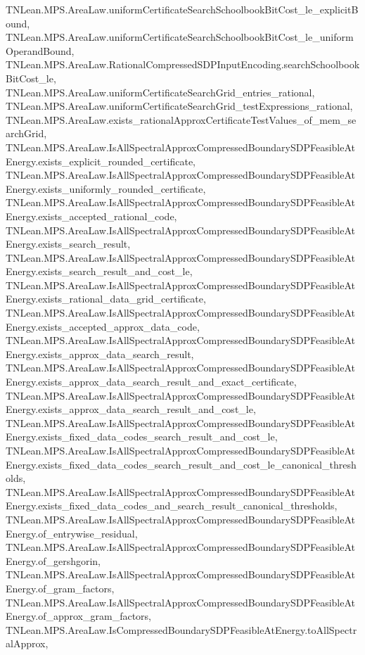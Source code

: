 \begin{lemma}
{        TNLean.MPS.AreaLaw.uniformCertificateSearchSchoolbookBitCost_le_explicitBound,
        TNLean.MPS.AreaLaw.uniformCertificateSearchSchoolbookBitCost_le_uniformOperandBound,
        TNLean.MPS.AreaLaw.RationalCompressedSDPInputEncoding.searchSchoolbookBitCost_le,
        TNLean.MPS.AreaLaw.uniformCertificateSearchGrid_entries_rational,
        TNLean.MPS.AreaLaw.uniformCertificateSearchGrid_testExpressions_rational,
        TNLean.MPS.AreaLaw.exists_rationalApproxCertificateTestValues_of_mem_searchGrid,
        TNLean.MPS.AreaLaw.IsAllSpectralApproxCompressedBoundarySDPFeasibleAtEnergy.exists_explicit_rounded_certificate,
        TNLean.MPS.AreaLaw.IsAllSpectralApproxCompressedBoundarySDPFeasibleAtEnergy.exists_uniformly_rounded_certificate,
        TNLean.MPS.AreaLaw.IsAllSpectralApproxCompressedBoundarySDPFeasibleAtEnergy.exists_accepted_rational_code,
        TNLean.MPS.AreaLaw.IsAllSpectralApproxCompressedBoundarySDPFeasibleAtEnergy.exists_search_result,
        TNLean.MPS.AreaLaw.IsAllSpectralApproxCompressedBoundarySDPFeasibleAtEnergy.exists_search_result_and_cost_le,
        TNLean.MPS.AreaLaw.IsAllSpectralApproxCompressedBoundarySDPFeasibleAtEnergy.exists_rational_data_grid_certificate,
        TNLean.MPS.AreaLaw.IsAllSpectralApproxCompressedBoundarySDPFeasibleAtEnergy.exists_accepted_approx_data_code,
        TNLean.MPS.AreaLaw.IsAllSpectralApproxCompressedBoundarySDPFeasibleAtEnergy.exists_approx_data_search_result,
        TNLean.MPS.AreaLaw.IsAllSpectralApproxCompressedBoundarySDPFeasibleAtEnergy.exists_approx_data_search_result_and_exact_certificate,
        TNLean.MPS.AreaLaw.IsAllSpectralApproxCompressedBoundarySDPFeasibleAtEnergy.exists_approx_data_search_result_and_cost_le,
        TNLean.MPS.AreaLaw.IsAllSpectralApproxCompressedBoundarySDPFeasibleAtEnergy.exists_fixed_data_codes_search_result_and_cost_le,
        TNLean.MPS.AreaLaw.IsAllSpectralApproxCompressedBoundarySDPFeasibleAtEnergy.exists_fixed_data_codes_search_result_and_cost_le_canonical_thresholds,
        TNLean.MPS.AreaLaw.IsAllSpectralApproxCompressedBoundarySDPFeasibleAtEnergy.exists_fixed_data_codes_and_search_result_canonical_thresholds,
        TNLean.MPS.AreaLaw.IsAllSpectralApproxCompressedBoundarySDPFeasibleAtEnergy.of_entrywise_residual,
        TNLean.MPS.AreaLaw.IsAllSpectralApproxCompressedBoundarySDPFeasibleAtEnergy.of_gershgorin,
        TNLean.MPS.AreaLaw.IsAllSpectralApproxCompressedBoundarySDPFeasibleAtEnergy.of_gram_factors,
        TNLean.MPS.AreaLaw.IsAllSpectralApproxCompressedBoundarySDPFeasibleAtEnergy.of_approx_gram_factors,
        TNLean.MPS.AreaLaw.IsCompressedBoundarySDPFeasibleAtEnergy.toAllSpectralApprox,
}
\end{lemma}
